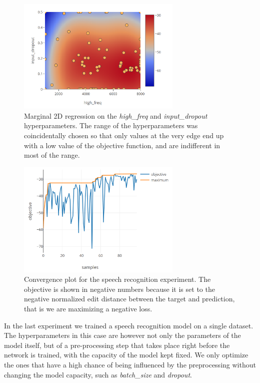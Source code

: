 \begin{figure}
	\begin{center}
		\includegraphics[width=0.7\textwidth]{images/speech-2d-almost-insensitive.png}
		\caption{Marginal 2D regression on the \emph{high\_freq} and \emph{input\_dropout} hyperparameters. The range of the hyperparameters was coincidentally chosen so that only values at the very edge end up with a low value of the objective function, and are indifferent in most of the range.}
		\label{figure:2d-almost-insensitive}
	\end{center}
\end{figure}

\begin{figure}
	\begin{center}
		\includegraphics[width=0.7\textwidth]{images/speech-convergence.png}
		\caption{Convergence plot for the speech recognition experiment. The objective is shown in negative numbers because it is set to the negative normalized edit distance between the target and prediction, that is we are maximizing a negative loss.}
		\label{figure:speech-convergence}
	\end{center}
\end{figure}

In the last experiment we trained a speech recognition model on a single dataset. The hyperparameters in this case are however not only the parameters of the model itself, but of a pre-processing step that takes place right before the network is trained, with the capacity of the model kept fixed. We only optimize the ones that have a high chance of being influenced by the preprocessing without changing the model capacity, such as \emph{batch\_size} and \emph{dropout}.

